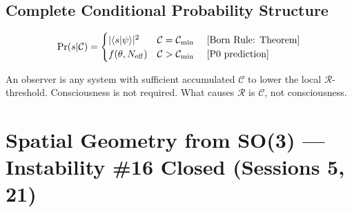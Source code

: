 \documentclass[12pt, a4paper]{article}
\begin{document}
\subsection{Complete Conditional Probability Structure}

\[
  \Pr(s|\mathcal{C}) =
  \begin{cases}
    |\langle s|\psi\rangle|^2 & \mathcal{C} = \mathcal{C}_{\min} \text{ \quad [Born Rule: Theorem]}\\
    f(\theta, N_{\mathrm{eff}}) & \mathcal{C} > \mathcal{C}_{\min} \text{ \quad [P0 prediction]}
  \end{cases}
\]

An observer is any system with sufficient accumulated $\mathcal{C}$ to lower the local
$\mathcal{R}$-threshold. Consciousness is not required. What causes $\mathcal{R}$ is
$\mathcal{C}$, not consciousness.

\section{Spatial Geometry from SO(3) --- Instability \#16 Closed (Sessions 5, 21)}
\end{document}
